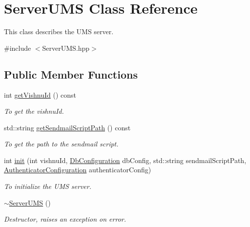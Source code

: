 \hypertarget{classServerUMS}{
\section{ServerUMS Class Reference}
\label{classServerUMS}
}


This class describes the UMS server.  




{\ttfamily \#include $<$ServerUMS.hpp$>$}

\subsection*{Public Member Functions}
\begin{DoxyCompactItemize}
\item 
int \hyperlink{classServerUMS_af5943e226e5d3122ae98771f34cbef79}{getVishnuId} () const 
\begin{DoxyCompactList}\small\item\em To get the vishnuId. \item\end{DoxyCompactList}\item 
std::string \hyperlink{classServerUMS_aa8e658cdcdb326d25460948e5f5b91b9}{getSendmailScriptPath} () const 
\begin{DoxyCompactList}\small\item\em To get the path to the sendmail script. \item\end{DoxyCompactList}\item 
int \hyperlink{classServerUMS_a34e2bc6eff48a00a11299702b61a3dbd}{init} (int vishnuId, \hyperlink{classDbConfiguration}{DbConfiguration} dbConfig, std::string sendmailScriptPath, \hyperlink{classAuthenticatorConfiguration}{AuthenticatorConfiguration} authenticatorConfig)
\begin{DoxyCompactList}\small\item\em To initialize the UMS server. \item\end{DoxyCompactList}\item 
\hypertarget{classServerUMS_a9d94c92a660ecfda2930894dd4b772bf}{
\hyperlink{classServerUMS_a9d94c92a660ecfda2930894dd4b772bf}{$\sim$ServerUMS} ()}
\label{classServerUMS_a9d94c92a660ecfda2930894dd4b772bf}

\begin{DoxyCompactList}\small\item\em Destructor, raises an exception on error. \item\end{DoxyCompactList}\end{DoxyCompactItemize}
